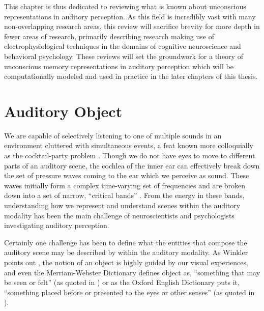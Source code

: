 \documentclass[a4paper,11pt,final]{ThesisStyle}
\begin{document}
This chapter is thus dedicated to reviewing what is known about unconscious representations in auditory perception.  As this field is incredibly vast with many non-overlapping research areas, this review will sacrifice brevity for more depth in fewer areas of research, primarily describing research making use of electrophysiological techniques in the domains of cognitive neuroscience and behavioral psychology.  These reviews will set the groundwork for a theory of unconscious memory representations in auditory perception which will be computationally modeled and used in practice in the later chapters of this thesis.   



\section{Auditory Object}

We are capable of selectively listening to one of multiple sounds in an environment cluttered with simultaneous events, a feat known more colloquially as the cocktail-party problem \cite{McDermott2009}.  Though we do not have eyes to move to different parts of an auditory scene, the cochlea of the inner ear can effectively break down the set of pressure waves coming to the ear which we perceive as sound.  These waves initially form a complex time-varying set of frequencies and are broken down into a set of narrow, ``critical bands'' \cite{Fletcher1940}.  From the energy in these bands, understanding how we represent and understand scenes within the auditory modality has been the main challenge of neuroscientists and psychologists investigating auditory perception.  

Certainly one challenge has been to define what the entities that compose the auditory scene may be described by within the auditory modality.  As Winkler points out \cite{Ist2010}, the notion of an object is highly guided by our visual experiences, and even the Merriam-Webster Dictionary defines object as, ``something that may be seen or felt'' (as quoted in \cite{Ist2010}) or as the Oxford English Dictionary puts it, ``something placed before or presented to the eyes or other senses'' (as quoted in \cite{Griffiths2004}).  
\end{document}
